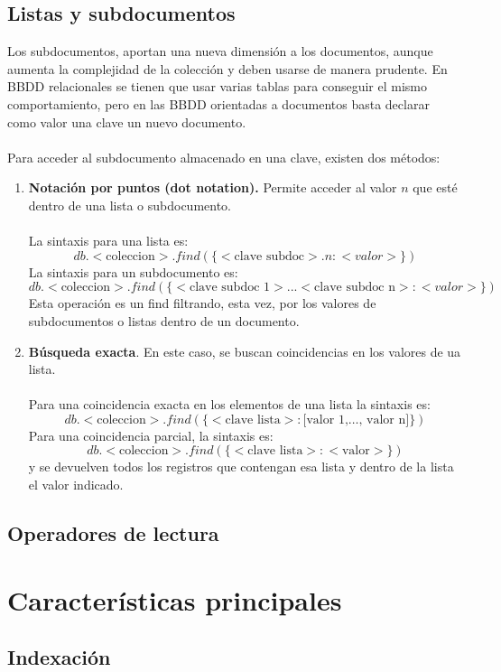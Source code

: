 \subsection{Listas y subdocumentos}
Los subdocumentos, aportan una nueva dimensión a los documentos, aunque aumenta la complejidad de la colección y deben usarse de manera prudente. En BBDD relacionales se tienen que usar varias tablas para conseguir el mismo comportamiento, pero en las BBDD orientadas a documentos basta declarar como valor una clave un nuevo documento.\\\\
Para acceder al subdocumento almacenado en una clave, existen dos métodos:
\begin{enumerate}
	\item \textbf{Notación por puntos (dot notation).} Permite acceder al valor $n$ que esté dentro de una lista o subdocumento.\\\\
	La sintaxis para una lista es:
$$db.<\textrm{coleccion}>.find( \{<\textrm{clave subdoc}>.n:<valor>\} )$$
	La sintaxis para un subdocumento es:
$$db.<\textrm{coleccion}>.find( \{<\textrm{clave subdoc 1}>...<\textrm{clave subdoc n}>:<valor>\} )$$
Esta operación es un find filtrando, esta vez, por los valores de subdocumentos o listas dentro de un documento.
	\item \textbf{Búsqueda exacta}. En este caso, se buscan coincidencias en los valores de ua lista. \\\\
	Para una coincidencia exacta en los elementos de una lista la sintaxis es:
	$$db.<\textrm{coleccion}>.find( \{<\textrm{clave lista}>:\textrm{[valor 1,\ldots, valor n]}\} )$$
	Para una coincidencia parcial, la sintaxis es:
		$$db.<\textrm{coleccion}>.find( \{<\textrm{clave lista}>:<\textrm{valor}>\} )$$
	y se devuelven todos los registros que contengan esa lista y dentro de la lista el valor indicado.
\end{enumerate}
\subsection{Operadores de lectura}

\section{Características principales}
\subsection{Indexación}
